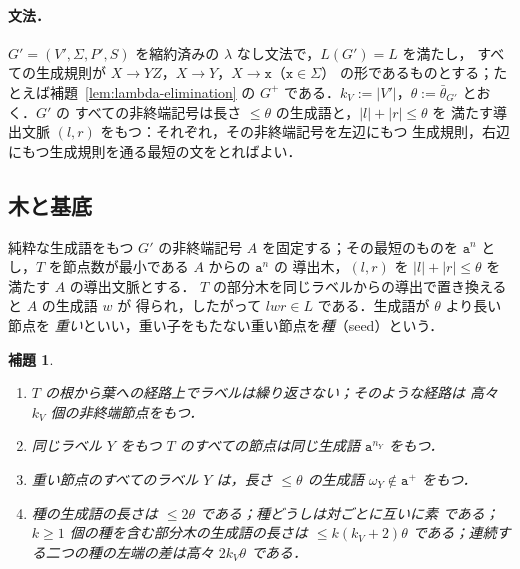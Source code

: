 \documentclass[11pt,a4paper]{ltjsarticle}
\numberwithin{equation}{section}
\theoremstyle{plain}
\newtheorem{lemma}[theorem]{補題}
\theoremstyle{definition}
\theoremstyle{remark}
\theoremstyle{plain}
\begin{document}
\paragraph{文法．}
$G'=(V',\Sigma,P',S)$ を縮約済みの $\lambda$ なし文法で，$L(G')=L$ を満たし，
すべての生成規則が $X\to YZ$，$X\to Y$，$X\to\mathtt x$（$\mathtt x\in\Sigma$）
の形であるものとする；たとえば補題~\ref{lem:lambda-elimination} の
$G^+$ である．$k_V:=|V'|$，$\theta:=\bar\theta_{G'}$ とおく．$G'$ の
すべての非終端記号は長さ $\le\theta$ の生成語と，$|l|+|r|\le\theta$ を
満たす導出文脈 $(l,r)$ をもつ：それぞれ，その非終端記号を左辺にもつ
生成規則，右辺にもつ生成規則を通る最短の文をとればよい．

\subsection{木と基底}

純粋な生成語をもつ $G'$ の非終端記号 $A$ を固定する；その最短のものを
$\mathtt a^n$ とし，$T$ を節点数が最小である $A$ からの $\mathtt a^n$ の
導出木，$(l,r)$ を $|l|+|r|\le\theta$ を満たす $A$ の導出文脈とする．
$T$ の部分木を同じラベルからの導出で置き換えると $A$ の生成語 $w$ が
得られ，したがって $lwr\in L$ である．生成語が $\theta$ より長い節点を
\emph{重い}といい，重い子をもたない重い節点を\emph{種}（seed）という．

\begin{lemma}
\label{lem:app-h-tree}
\begin{enumerate}[label=\textup{(\alph*)},leftmargin=*]
\item $T$ の根から葉への経路上でラベルは繰り返さない；そのような経路は
高々 $k_V$ 個の非終端節点をもつ．
\item 同じラベル $Y$ をもつ $T$ のすべての節点は同じ生成語
$\mathtt a^{n_Y}$ をもつ．
\item 重い節点のすべてのラベル $Y$ は，長さ $\le\theta$ の生成語
$\omega_Y\notin\mathtt a^+$ をもつ．
\item 種の生成語の長さは $\le2\theta$ である；種どうしは対ごとに互いに素
である；$k\ge1$ 個の種を含む部分木の生成語の長さは $\le k(k_V+2)\theta$
である；連続する二つの種の左端の差は高々 $2k_V\theta$ である．
\end{enumerate}
\end{lemma}
\end{document}

